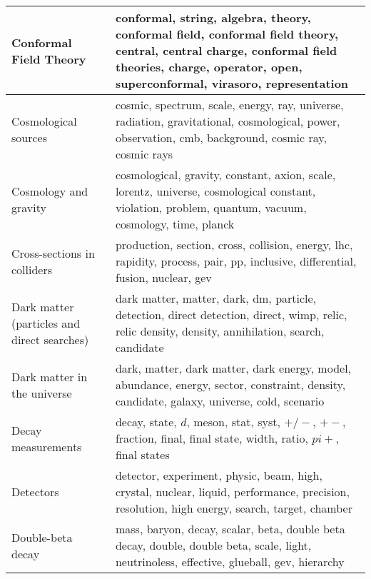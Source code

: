 \begin{longtable}[H]{p{}|p{}}
Conformal Field Theory                                &           conformal, string, algebra, theory, conformal field, conformal field theory, central, central charge, conformal field theories, charge, operator, open, superconformal, virasoro, representation \\ \midrule
Cosmological sources                                  &                                                       cosmic, spectrum, scale, energy, ray, universe, radiation, gravitational, cosmological, power, observation, cmb, background, cosmic ray, cosmic rays \\ \midrule
Cosmology and gravity                                 &                                                      cosmological, gravity, constant, axion, scale, lorentz, universe, cosmological constant, violation, problem, quantum, vacuum, cosmology, time, planck \\ \midrule
Cross-sections in colliders                           &                                                                             production, section, cross, collision, energy, lhc, rapidity, process, pair, pp, inclusive, differential, fusion, nuclear, gev \\ \midrule
Dark matter (particles and direct searches)           &                                                         dark matter, matter, dark, dm, particle, detection, direct detection, direct, wimp, relic, relic density, density, annihilation, search, candidate \\ \midrule
Dark matter in the universe                           &                                                                 dark, matter, dark matter, dark energy, model, abundance, energy, sector, constraint, density, candidate, galaxy, universe, cold, scenario \\ \midrule
Decay measurements                                    &                                                                                         decay, state, $d$, meson, stat, syst, $+/-$, $+-$, fraction, final, final state, width, ratio, $pi+$, final states \\ \midrule
Detectors                                             &                                                               detector, experiment, physic, beam, high, crystal, nuclear, liquid, performance, precision, resolution, high energy, search, target, chamber \\ \midrule
Double-beta decay                                     &                                                                 mass, baryon, decay, scalar, beta, double beta decay, double, double beta, scale, light, neutrinoless, effective, glueball, gev, hierarchy \\ \midrule

\end{longtable}
